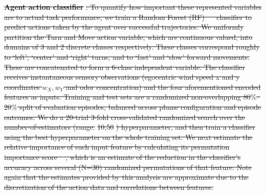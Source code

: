 \documentclass[5p,twocolumn,authoryear]{elsarticle}
\providecommand{\DIFdeltex}[1]{{\protect\color{red}\sout{#1}}}                      %
\providecommand{\DIFdelbegin}{} %
\providecommand{\DIFdelend}{} %
\providecommand{\DIFdel}[1]{\texorpdfstring{\DIFdeltex{#1}}{}} %
\newcommand{\DIFscaledelfig}{0.5}
\newlength{\DIFdelgraphicswidth} %
\newlength{\DIFdelgraphicsheight} %
\newcommand{\DIFdelincludegraphics}[2][]{%
\sbox{\DIFdelgraphicsbox}{\DIFOincludegraphics[#1]{#2}}%
\settoboxwidth{\DIFdelgraphicswidth}{\DIFdelgraphicsbox} %
\settoboxtotalheight{\DIFdelgraphicsheight}{\DIFdelgraphicsbox} %
\scalebox{\DIFscaledelfig}{%
\parbox[b]{\DIFdelgraphicswidth}{\usebox{\DIFdelgraphicsbox}\\[-\baselineskip] \rule{\DIFdelgraphicswidth}{0em}}\llap{\resizebox{\DIFdelgraphicswidth}{\DIFdelgraphicsheight}{%
\setlength{\unitlength}{\DIFdelgraphicswidth}%
\begin{picture}(1,1)%
\thicklines\linethickness{2pt} %
{\color[rgb]{1,0,0}\put(0,0){\framebox(1,1){}}}%
{\color[rgb]{1,0,0}\put(0,0){\line( 1,1){1}}}%
{\color[rgb]{1,0,0}\put(0,1){\line(1,-1){1}}}%
\end{picture}%
}\hspace*{3pt}}} %
} %
\DeclareRobustCommand{\DIFdelbegin}{\DIFOdelbegin \let\includegraphics\DIFdelincludegraphics} %
\DeclareRobustCommand{\DIFdelend}{\DIFOaddend \let\includegraphics\DIFOincludegraphics} %
\begin{document}
\DIFdelbegin \textbf{\DIFdel{Agent action classifier}}%
\DIFdel{: To quantify how important these represented variables are to actual task performance, we train a Random Forest (RF) \mbox{%
\citep{breiman2001random} }\hspace{0pt}%
classifier to predict actions taken by the agent over successful trajectories.
We uniformly partition the Turn and Move action variable, which are continuous valued, into domains of 3 and 2 discrete classes respectively.
These classes correspond roughly to `left', `center' and `right' turns, and to `fast' and `slow' forward movements.
These are concatenated to form a 6-class independent variable.
The classifier receives instantaneous sensory observations (egocentric wind speed x and y coordinates $w_X, w_Y$ and odor concentration) and the four aforementioned encoded features as inputs. 
Training and test sets are a randomized non-overlapping 80$\%$--20$\%$ split of evaluation episodes, balanced across plume configuration and episode outcomes.
We do a 20-trial 3-fold cross-validated randomized search over the number-of-estimators (range: }%
\DIFdel{10,50}%
\DIFdel{) hyperparameter, and then train a classifier using the best hyperparameter on the whole training set. 
We next estimate the relative importance of each input feature by calculating its permutation importance score \mbox{%
\citep{strobl2008conditional, breiman2001random}}\hspace{0pt}%
, which is an estimate of the reduction in the classifier’s accuracy across several (N=30) randomized permutations of that feature.
Note again that the estimates provided by this analysis are approximate due to the discretization of the action data and correlations between features.
}\DIFdelend %
\end{document}
